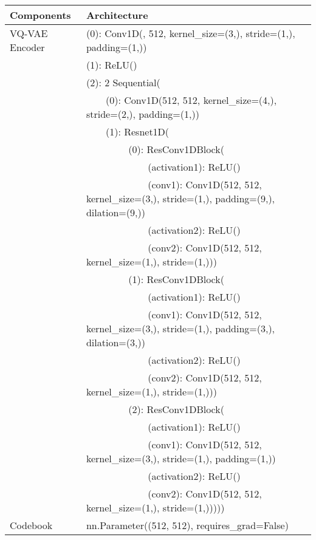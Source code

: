\documentclass[10pt,twocolumn,letterpaper]{article}
\begin{document}
{\begin{table*}[h]
    \centering\setlength{\tabcolsep}{12pt}
    \begin{tabular}{ll}
    \toprule
        Components & Architecture \\ \midrule
        VQ-VAE Encoder & (0): Conv1D(, 512, kernel\_size=(3,), stride=(1,), padding=(1,)) \\
        ~ & (1): ReLU() \\
        ~ & (2): 2  Sequential( \\
        ~ &   ~~~~(0): Conv1D(512, 512, kernel\_size=(4,), stride=(2,), padding=(1,)) \\
        ~ &   ~~~~(1): Resnet1D( \\
        ~ &   ~~~~~~~~    (0): ResConv1DBlock( \\
        ~ &   ~~~~~~~~~~~~      (activation1): ReLU() \\
        ~ &   ~~~~~~~~~~~~      (conv1): Conv1D(512, 512, kernel\_size=(3,), stride=(1,), padding=(9,), dilation=(9,)) \\
        ~ &   ~~~~~~~~~~~~      (activation2): ReLU() \\
        ~ &   ~~~~~~~~~~~~      (conv2): Conv1D(512, 512, kernel\_size=(1,), stride=(1,))) \\
        ~ &   ~~~~~~~~    (1): ResConv1DBlock( \\
        ~ &   ~~~~~~~~~~~~      (activation1): ReLU() \\
        ~ &    ~~~~~~~~~~~~     (conv1): Conv1D(512, 512, kernel\_size=(3,), stride=(1,), padding=(3,), dilation=(3,)) \\
        ~ &   ~~~~~~~~~~~~      (activation2): ReLU() \\
        ~ &    ~~~~~~~~~~~~     (conv2): Conv1D(512, 512, kernel\_size=(1,), stride=(1,))) \\
        ~ &   ~~~~~~~~    (2): ResConv1DBlock( \\
        ~ &   ~~~~~~~~~~~~      (activation1): ReLU() \\
        ~ &   ~~~~~~~~~~~~      (conv1): Conv1D(512, 512, kernel\_size=(3,), stride=(1,), padding=(1,)) \\
        ~ &   ~~~~~~~~~~~~      (activation2): ReLU() \\
        ~ &   ~~~~~~~~~~~~      (conv2): Conv1D(512, 512, kernel\_size=(1,), stride=(1,))))) \\
        \midrule
        Codebook & nn.Parameter((512, 512), requires\_grad=False) \\
        \midrule

\end{tabular}
\end{table*}}
\end{document}
